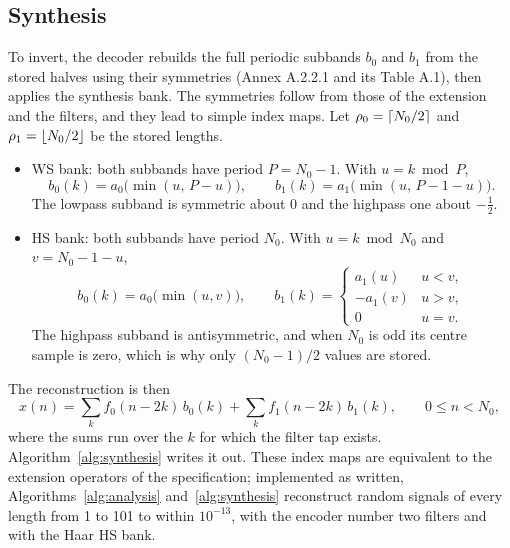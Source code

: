 \subsection{Synthesis}

To invert, the decoder rebuilds the full periodic subbands $b_0$ and $b_1$ from the stored
halves using their symmetries (Annex A.2.2.1 and its Table A.1), then applies the synthesis
bank. The symmetries follow from those of the extension and the filters, and they lead to
simple index maps. Let $\rho_0 = \lceil N_0/2 \rceil$ and $\rho_1 = \lfloor N_0/2 \rfloor$ be the stored
lengths.
\begin{itemize}
  \item WS bank: both subbands have period $P = N_0 - 1$. With $u = k \bmod P$,
    \[
      b_0(k) = a_0\bigl(\min(u,\,P-u)\bigr), \qquad b_1(k) = a_1\bigl(\min(u,\,P-1-u)\bigr).
    \]
    The lowpass subband is symmetric about $0$ and the highpass one about $-\tfrac12$.
  \item HS bank: both subbands have period $N_0$. With $u = k \bmod N_0$ and $v = N_0-1-u$,
    \[
      b_0(k) = a_0\bigl(\min(u,v)\bigr), \qquad
      b_1(k) = \begin{cases} a_1(u) & u < v,\\ -a_1(v) & u > v,\\ 0 & u = v. \end{cases}
    \]
    The highpass subband is antisymmetric, and when $N_0$ is odd its centre sample is zero,
    which is why only $(N_0-1)/2$ values are stored.
\end{itemize}
The reconstruction is then
\begin{equation}
  x(n) = \sum_{k} f_0(n-2k)\,b_0(k) + \sum_{k} f_1(n-2k)\,b_1(k), \qquad 0 \le n < N_0,
  \label{eq:synthesis}
\end{equation}
where the sums run over the $k$ for which the filter tap exists. Algorithm~\ref{alg:synthesis}
writes it out. These index maps are equivalent to the extension operators of the
specification; implemented as written, Algorithms~\ref{alg:analysis} and~\ref{alg:synthesis}
reconstruct random signals of every length from 1 to 101 to within $10^{-13}$, with the
encoder number two filters and with the Haar HS bank.

